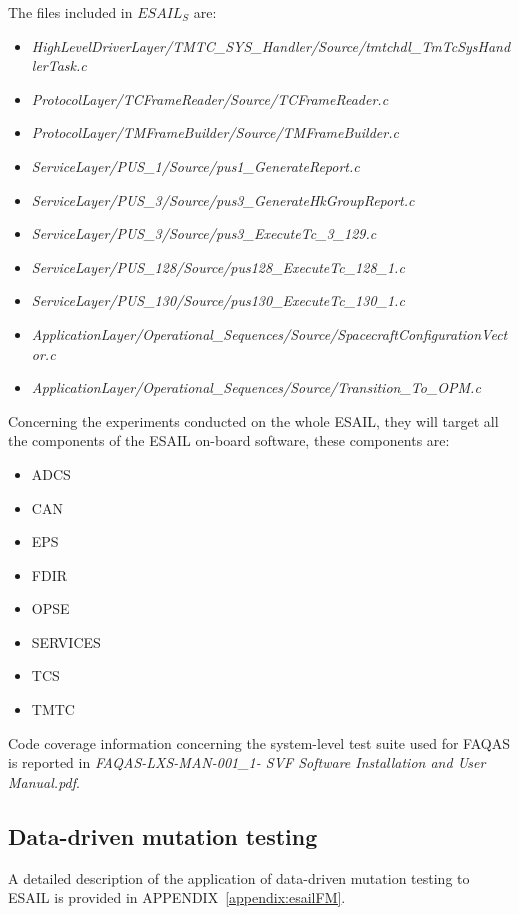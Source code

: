 \STARTCHANGEDNOV
The files included in $\mathit{ESAIL}_S$ are:
\begin{itemize}
\item \emph{HighLevelDriverLayer/TMTC\_SYS\_Handler/Source/tmtchdl\_TmTcSysHandlerTask.c}
\item \emph{ProtocolLayer/TCFrameReader/Source/TCFrameReader.c}
\item \emph{ProtocolLayer/TMFrameBuilder/Source/TMFrameBuilder.c}
\item \emph{ServiceLayer/PUS\_1/Source/pus1\_GenerateReport.c}
\item \emph{ServiceLayer/PUS\_3/Source/pus3\_GenerateHkGroupReport.c}
\item \emph{ServiceLayer/PUS\_3/Source/pus3\_ExecuteTc\_3\_129.c}
\item \emph{ServiceLayer/PUS\_128/Source/pus128\_ExecuteTc\_128\_1.c}
\item \emph{ServiceLayer/PUS\_130/Source/pus130\_ExecuteTc\_130\_1.c}
\item \emph{ApplicationLayer/Operational\_Sequences/Source/SpacecraftConfigurationVector.c}
\item \emph{ApplicationLayer/Operational\_Sequences/Source/Transition\_To\_OPM.c}
\end{itemize}
\ENDCHANGEDNOV

Concerning the experiments conducted on the whole ESAIL, they will target all the components of the ESAIL on-board software, these components are:

\begin{itemize}
	\item ADCS
	\item CAN
	\item EPS
	\item FDIR
	\item OPSE
	\item SERVICES
	\item TCS
	\item TMTC
\end{itemize}

Code coverage information concerning the system-level test suite used for FAQAS is reported in \emph{FAQAS-LXS-MAN-001\_1- SVF Software Installation and User Manual.pdf}.


\subsection{Data-driven mutation testing}

A detailed description of the application of data-driven mutation testing to ESAIL is provided in APPENDIX~\ref{appendix:esailFM}.

